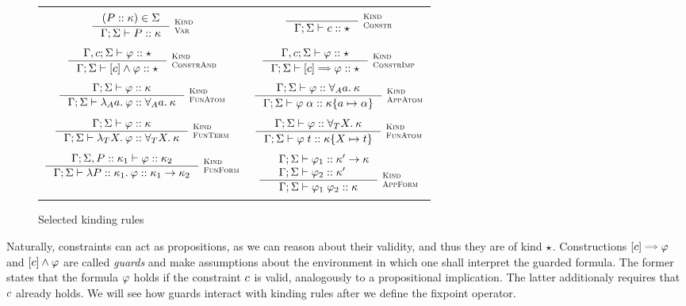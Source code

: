 \documentclass[english, mgr]{iithesis}
\renewcommand{\it}[1]{\textit{#1}}
\newcommand{\scbrk}[2]{\myatop{\textsc{#1}}{\textsc{#2}}}
\begin{document}
\begin{figure}[htpb]
  \begin{tabularx}{\textwidth}{|CC|}
    \hline & \\
     $\inference{
      (\propv \ofkind \kind) \in  \kEnv
  }{
    \cEnv; \kEnv \vdash \propv \ofkind \kind
  }\:\scbrk{Kind}{Var}
  $ &
     $\inference{
  }{
    \cEnv; \kEnv \vdash \fConstr{\constr} \ofkind \kProp
  }\:\scbrk{Kind}{Constr}
  $ \\ & \\ $
  \inference{
    \cEnv,\constr; \kEnv \vdash \formphi \ofkind \kProp
  }{
    \cEnv; \kEnv \vdash \fCAnd{\constr} \formphi \ofkind \kProp
  }\:\scbrk{Kind}{ConstrAnd}
  $ & $
  \inference{
    \cEnv,\constr; \kEnv \vdash \formphi \ofkind \kProp
  }{
    \cEnv; \kEnv \vdash \fCImp{\constr} \formphi \ofkind \kProp
  }\:\scbrk{Kind}{ConstrImp}$ \\ & \\
    $\inference{
      \cEnv; \kEnv \vdash \formphi \ofkind \kind
    }{
      \cEnv; \kEnv \vdash \fLamAtom{\atomv} \formphi \ofkind \kForallAtom{\atomv}\kind
    }\:\scbrk{Kind}{FunAtom}$
    &
    $\inference{
      \cEnv;\kEnv\vdash \formphi \ofkind \kForallAtom{\atomv}\kind
    }{
      \cEnv;\kEnv\vdash \formphi \fAppAtom{\atomexp} \ofkind \kind \subst{\atomv}{\atomexp}
    }\:\scbrk{Kind}{AppAtom}$
    \\ & \\
    $\inference{
      \cEnv; \kEnv \vdash \formphi \ofkind \kind
    }{
      \cEnv; \kEnv \vdash \fLamTerm{\termv} \formphi \ofkind \kForallTerm{\termv}\kind
    }\:\scbrk{Kind}{FunTerm}$
    &
    $\inference{
      \cEnv;\kEnv\vdash \formphi \ofkind \kForallTerm{\termv}\kind
    }{
      \cEnv;\kEnv\vdash \formphi \fAppTerm{\term} \ofkind \kind\subst{\termv}{\term}
    }\:\scbrk{Kind}{FunAtom}$
    \\ & \\
    $\inference{
      \cEnv; \kEnv, \propv \ofkind \kind_1 \vdash \formphi \ofkind \kind_2
    }{
      \cEnv; \kEnv \vdash \fLamForm{\propv}{\kind_1} \formphi \ofkind \kind_1 \karrow \kind_2
    }\:\scbrk{Kind}{FunForm}$
    &
    $\inference{
      \quad \cEnv; \kEnv \vdash \formphi_1 \ofkind \kind' \karrow \kind
      \\
      \quad \cEnv; \kEnv \vdash \formphi_2 \ofkind \kind' \hfill
    }{
      \cEnv;\kEnv\vdash \formphi_1 \fApp \formphi_2 \ofkind \kind
    }\:\scbrk{Kind}{AppForm}$
    \\ & \\
    \hline
\end{tabularx}
  \caption{Selected kinding rules}
  \label{fig:kinding}
\end{figure}
Naturally, constraints can act as propositions, as we can reason about their
validity, and thus they are of kind $\star$.
Constructions $\fCImp{\constr} \formphi$ and $[c]\wedge \varphi$
are called \it{guards} and make assumptions about the environment in which
one shall interpret the guarded formula.
The former states that the formula $\varphi$ holds if the constraint $c$ is valid,
analogously to a propositional implication.
The latter additionaly requires that $c$ already holds.
We will see how guards interact with kinding rules after we define the fixpoint operator.
\end{document}
